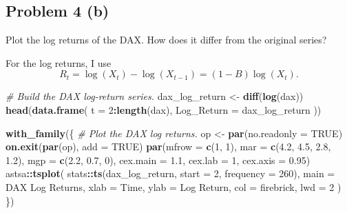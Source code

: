 \documentclass[
  10pt,
]{extarticle}
\newenvironment{Shaded}{\begin{snugshade}}{\end{snugshade}}
\newcommand{\AttributeTok}[1]{\textcolor[rgb]{0.13,0.29,0.53}{#1}}
\newcommand{\CommentTok}[1]{\textcolor[rgb]{0.56,0.35,0.01}{\textit{#1}}}
\newcommand{\ConstantTok}[1]{\textcolor[rgb]{0.56,0.35,0.01}{#1}}
\newcommand{\DecValTok}[1]{\textcolor[rgb]{0.00,0.00,0.81}{#1}}
\newcommand{\FloatTok}[1]{\textcolor[rgb]{0.00,0.00,0.81}{#1}}
\newcommand{\FunctionTok}[1]{\textcolor[rgb]{0.13,0.29,0.53}{\textbf{#1}}}
\newcommand{\NormalTok}[1]{#1}
\newcommand{\OtherTok}[1]{\textcolor[rgb]{0.56,0.35,0.01}{#1}}
\newcommand{\SpecialCharTok}[1]{\textcolor[rgb]{0.81,0.36,0.00}{\textbf{#1}}}
\newcommand{\StringTok}[1]{\textcolor[rgb]{0.31,0.60,0.02}{#1}}
\begin{document}
\newpage

\subsection{Problem 4 (b)}\label{problem-4-b}

\begin{problem}[Problem 4 (b)]
Plot the log returns of the DAX. How does it differ from the original series?
\end{problem}

For the log returns, I use
\[
R_t = \log(X_t)-\log(X_{t-1}) = (1-B)\log(X_t).
\]

\begin{Shaded}
\begin{Highlighting}[]
\CommentTok{\# Build the DAX log{-}return series.}
\NormalTok{dax\_log\_return }\OtherTok{\textless{}{-}} \FunctionTok{diff}\NormalTok{(}\FunctionTok{log}\NormalTok{(dax))}
\FunctionTok{head}\NormalTok{(}\FunctionTok{data.frame}\NormalTok{(}
  \AttributeTok{t =} \DecValTok{2}\SpecialCharTok{:}\FunctionTok{length}\NormalTok{(dax),}
  \AttributeTok{Log\_Return =}\NormalTok{ dax\_log\_return}
\NormalTok{))}
\end{Highlighting}
\end{Shaded}

\begin{Shaded}
\begin{Highlighting}[]
\FunctionTok{with\_family}\NormalTok{(\{}
  \CommentTok{\# Plot the DAX log returns.}
\NormalTok{  op }\OtherTok{\textless{}{-}} \FunctionTok{par}\NormalTok{(}\AttributeTok{no.readonly =} \ConstantTok{TRUE}\NormalTok{)}
  \FunctionTok{on.exit}\NormalTok{(}\FunctionTok{par}\NormalTok{(op), }\AttributeTok{add =} \ConstantTok{TRUE}\NormalTok{)}
  \FunctionTok{par}\NormalTok{(}\AttributeTok{mfrow =} \FunctionTok{c}\NormalTok{(}\DecValTok{1}\NormalTok{, }\DecValTok{1}\NormalTok{), }\AttributeTok{mar =} \FunctionTok{c}\NormalTok{(}\FloatTok{4.2}\NormalTok{, }\FloatTok{4.5}\NormalTok{, }\FloatTok{2.8}\NormalTok{, }\FloatTok{1.2}\NormalTok{), }\AttributeTok{mgp =} \FunctionTok{c}\NormalTok{(}\FloatTok{2.2}\NormalTok{, }\FloatTok{0.7}\NormalTok{, }\DecValTok{0}\NormalTok{), }\AttributeTok{cex.main =} \FloatTok{1.1}\NormalTok{, }\AttributeTok{cex.lab =} \DecValTok{1}\NormalTok{, }\AttributeTok{cex.axis =} \FloatTok{0.95}\NormalTok{)}
\NormalTok{  astsa}\SpecialCharTok{::}\FunctionTok{tsplot}\NormalTok{(}
\NormalTok{    stats}\SpecialCharTok{::}\FunctionTok{ts}\NormalTok{(dax\_log\_return, }\AttributeTok{start =} \DecValTok{2}\NormalTok{, }\AttributeTok{frequency =} \DecValTok{260}\NormalTok{),}
    \AttributeTok{main =} \StringTok{\textquotesingle{}DAX Log Returns\textquotesingle{}}\NormalTok{,}
    \AttributeTok{xlab =} \StringTok{\textquotesingle{}Time\textquotesingle{}}\NormalTok{,}
    \AttributeTok{ylab =} \StringTok{\textquotesingle{}Log Return\textquotesingle{}}\NormalTok{,}
    \AttributeTok{col =} \StringTok{\textquotesingle{}firebrick\textquotesingle{}}\NormalTok{,}
    \AttributeTok{lwd =} \DecValTok{2}
\NormalTok{  )}
\NormalTok{\})}
\end{Highlighting}
\end{Shaded}
\end{document}
